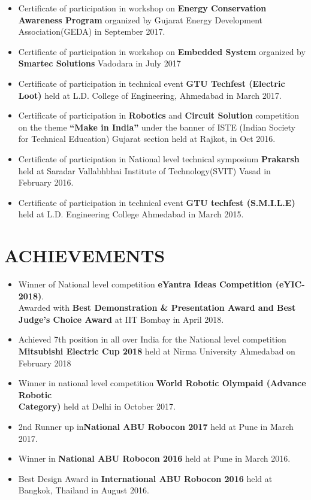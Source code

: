 \documentclass{res}
\begin{document}
\begin{resume}
\begin{itemize}
\item Certificate of participation in workshop on \textbf {Energy Conservation Awareness Program} organized by Gujarat Energy Development Association(GEDA) in September 2017.
\item Certificate of participation in workshop on \textbf {Embedded System} organized by \textbf {Smartec Solutions} Vadodara in July 2017 
\item Certificate of participation in technical event \textbf {GTU Techfest (Electric Loot)} held at L.D. College of Engineering, Ahmedabad in March 2017.
\item Certificate of participation in \textbf {Robotics} and \textbf {Circuit Solution} competition on the theme \textbf{“Make in India”} under the banner of ISTE (Indian Society for Technical Education) Gujarat section held at Rajkot, in Oct 2016.
\item Certificate of participation in National level technical symposium \textbf{Prakarsh} held at Saradar Vallabhbhai Institute of Technology(SVIT) Vasad in February 2016.
\item Certificate of participation in technical event \textbf {GTU techfest (S.M.I.L.E)} held at L.D. Engineering College Ahmedabad in March 2015.

 \end{itemize}


\section{ACHIEVEMENTS}
\begin{itemize}\itemsep -2pt  %

\item  Winner of National level competition \textbf {eYantra Ideas Competition (eYIC-2018)}.\\ Awarded with \textbf{Best Demonstration \& Presentation Award and  Best Judge’s Choice Award } at IIT Bombay in April 2018.
\item Achieved 7th position in all over India for the National level competition \textbf {Mitsubishi Electric Cup 2018} held at Nirma University Ahmedabad on February 2018 
\item Winner in national level competition \textbf {World Robotic Olympaid (Advance Robotic \\Category)} held at Delhi in October 2017.
\item 2nd Runner up in\textbf {National ABU Robocon 2017} held at Pune in March 2017.  
\item Winner in \textbf {National ABU Robocon 2016} held at Pune in March 2016.
\item Best Design Award in \textbf {International ABU Robocon 2016} held at Bangkok, Thailand in August 2016.


\end{itemize}
\end{resume}
\end{document}

